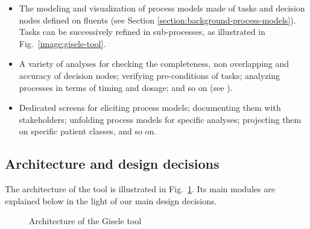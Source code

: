 \begin{itemize}
\item The modeling and visualization of process models made of tasks and decision nodes defined on fluents (see Section \ref{section:background-process-models}). Tasks can be successively refined in sub-processes, as illustrated in Fig.~\ref{image:gisele-tool}.
\item A variety of analyses for checking the completeness, non overlapping and accuracy of decision nodes; verifying pre-conditions of tasks; analyzing processes in terms of timing and dosage; and so on (see \cite{Damas:2011}).
\item Dedicated screens for eliciting process models; documenting them with stakeholders; unfolding process models for specific analyses; projecting them on specific patient classes, and so on.
\end{itemize}

\subsection*{Architecture and design decisions}

The architecture of the tool is illustrated in Fig.~\ref{image:gisele-tool-architecture}. Its main modules are explained below in the light of our main design decisions.

\begin{figure}
\centering{}
  \caption{Architecture of the Gisele tool\label{image:gisele-tool-architecture}}
\end{figure}

